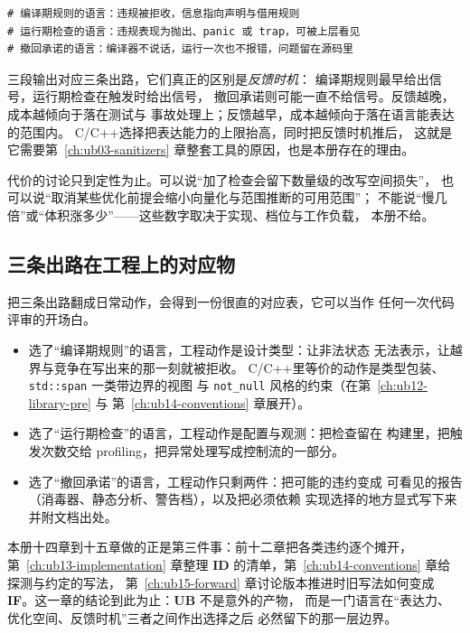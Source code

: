 \documentclass[12pt,a4paper,fontset=fandol]{ctexbook}
\newcommand{\Tp}[1]{\texttt{#1}}
\newcommand{\Lang}[1]{\textsf{#1}}
\newcommand{\CL}{\Lang{C}}
\newcommand{\CPP}{\Lang{C++}}
\newcommand{\UB}{\textbf{\textsf{UB}}}
\newcommand{\IDB}{\textbf{\textsf{ID}}}
\newcommand{\ILLF}{\textbf{\textsf{IF}}}
\begin{document}
\begin{lstlisting}[style=outstyle, caption={工具输出样例：同一类问题在不同层的可见形式（示意形状，非实测）}]
# 编译期规则的语言：违规被拒收，信息指向声明与借用规则
# 运行期检查的语言：违规表现为抛出、panic 或 trap，可被上层看见
# 撤回承诺的语言：编译器不说话，运行一次也不报错，问题留在源码里
\end{lstlisting}

三段输出对应三条出路，它们真正的区别是\emph{反馈时机}：
编译期规则最早给出信号，运行期检查在触发时给出信号，
撤回承诺则可能一直不给信号。反馈越晚，成本越倾向于落在测试与
事故处理上；反馈越早，成本越倾向于落在语言能表达的范围内。
\CL/\CPP 选择把表达能力的上限抬高，同时把反馈时机推后，
这就是它需要第~\ref{ch:ub03-sanitizers} 章整套工具的原因，也是本册存在的理由。

代价的讨论只到定性为止。可以说“加了检查会留下数量级的改写空间损失”，
也可以说“取消某些优化前提会缩小向量化与范围推断的可用范围”；
不能说“慢几倍”或“体积涨多少”——这些数字取决于实现、档位与工作负载，
本册不给。

\subsection{三条出路在工程上的对应物}\label{sec:ub02-engineering}

把三条出路翻成日常动作，会得到一份很直的对应表，它可以当作
任何一次代码评审的开场白。

\begin{itemize}
  \item 选了“编译期规则”的语言，工程动作是设计类型：让非法状态
        无法表示，让越界与竞争在写出来的那一刻就被拒收。
        \CL/\CPP 里等价的动作是类型包装、\Tp{std::span} 一类带边界的视图
        与 \Tp{not\_null} 风格的约束（在第~\ref{ch:ub12-library-pre} 与
        第~\ref{ch:ub14-conventions} 章展开）。
  \item 选了“运行期检查”的语言，工程动作是配置与观测：把检查留在
        构建里，把触发次数交给 profiling，把异常处理写成控制流的一部分。
  \item 选了“撤回承诺”的语言，工程动作只剩两件：把可能的违约变成
        可看见的报告（消毒器、静态分析、警告档），以及把必须依赖
        实现选择的地方显式写下来并附文档出处。
\end{itemize}

本册十四章到十五章做的正是第三件事：前十二章把各类违约逐个摊开，
第~\ref{ch:ub13-implementation} 章整理 \IDB{} 的清单，第~\ref{ch:ub14-conventions} 章给探测与约定的写法，
第~\ref{ch:ub15-forward} 章讨论版本推进时旧写法如何变成 \ILLF{}。这一章的结论到此为止：\UB{} 不是意外的产物，
而是一门语言在“表达力、优化空间、反馈时机”三者之间作出选择之后
必然留下的那一层边界。
\end{document}
